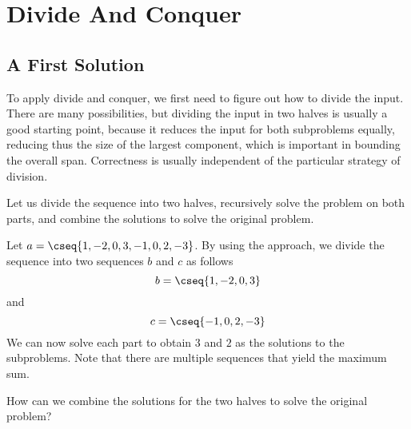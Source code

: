 \section{Divide And Conquer}
\label{sec:mcss::dc}


\subsection{A First Solution}
\label{sec:mcss::dc::first}

\begin{flex}
\label{grp:grm:mcss::dividing-the-input}

\begin{gram}
\label{grm:mcss::dividing-the-input}
To apply divide and conquer, we first need to figure out how to divide the input.
There are many possibilities, but dividing the input in two halves is
usually a good starting point, because it reduces the input for both
subproblems equally, reducing thus the size of the largest component,
which is important in bounding the overall span.
Correctness is usually independent of the particular strategy of
division.

Let us divide the sequence into two halves, recursively solve the
problem on both parts, and combine the solutions to solve the original
problem.

\end{gram}

\begin{example}
\label{ex:mcss1}
Let $a = \cseq{1, -2, 0, 3, -1, 0, 2, -3}$.  By using the approach, we
divide the sequence into two sequences $b$ and $c$ as follows
\[
b = \cseq{1, -2, 0, 3}
\]
and
\[
c = \cseq{-1, 0, 2, -3}
\]
We can now solve each part to obtain $3$ and $2$ as the solutions to
the subproblems.
Note that there are multiple sequences that yield the maximum sum.  

\end{example}
\end{flex}

\begin{cluster}
\label{grp:tch:mcss::combine}

\begin{teachask}
\label{tch:mcss::combine}
How can we combine the solutions for the two halves to solve the
original problem?

\end{teachask}
\end{cluster}

